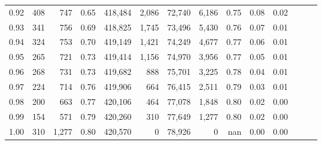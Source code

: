 \begin{tabular}{rrrrrrrrrrrrrr}
0.92 &    408 &    747 &  0.65 &  418,484 &    2,086 &  72,740 &   6,186 &  0.75 &  0.08 &      0.02 \\
0.93 &    341 &    756 &  0.69 &  418,825 &    1,745 &  73,496 &   5,430 &  0.76 &  0.07 &      0.01 \\
0.94 &    324 &    753 &  0.70 &  419,149 &    1,421 &  74,249 &   4,677 &  0.77 &  0.06 &      0.01 \\
0.95 &    265 &    721 &  0.73 &  419,414 &    1,156 &  74,970 &   3,956 &  0.77 &  0.05 &      0.01 \\
0.96 &    268 &    731 &  0.73 &  419,682 &      888 &  75,701 &   3,225 &  0.78 &  0.04 &      0.01 \\
0.97 &    224 &    714 &  0.76 &  419,906 &      664 &  76,415 &   2,511 &  0.79 &  0.03 &      0.01 \\
0.98 &    200 &    663 &  0.77 &  420,106 &      464 &  77,078 &   1,848 &  0.80 &  0.02 &      0.00 \\
0.99 &    154 &    571 &  0.79 &  420,260 &      310 &  77,649 &   1,277 &  0.80 &  0.02 &      0.00 \\
1.00 &    310 &  1,277 &  0.80 &  420,570 &        0 &  78,926 &       0 &   nan &  0.00 &      0.00 \\
\bottomrule
\end{tabular}
